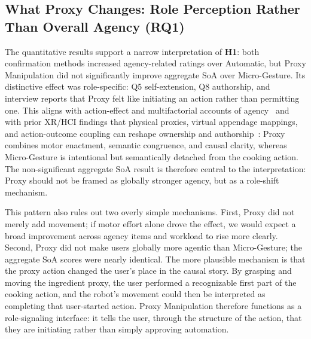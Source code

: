 \documentclass[sigconf,review,anonymous]{acmart}
\begin{document}
\subsection{What Proxy Changes: Role Perception Rather Than Overall Agency (RQ1)}
The quantitative results support a narrow interpretation of \textbf{H1}: both confirmation methods increased agency-related ratings over Automatic, but Proxy Manipulation did not significantly improve aggregate SoA over Micro-Gesture. Its distinctive effect was role-specific: Q5 self-extension, Q8 authorship, and interview reports that Proxy felt like initiating an action rather than permitting one. This aligns with action-effect and multifactorial accounts of agency~\cite{haggard2017sense, moore2016agency, chambon2014intentions, synofzik2008beyond} and with prior XR/HCI findings that physical proxies, virtual appendage mappings, and action-outcome coupling can reshape ownership and authorship~\cite{synofzik2008imove, 10.1145/3290605.3300673, 10.1145/3139131.3139149, 10.1145/3613904.3642340}: Proxy combines motor enactment, semantic congruence, and causal clarity, whereas Micro-Gesture is intentional but semantically detached from the cooking action. The non-significant aggregate SoA result is therefore central to the interpretation: Proxy should not be framed as globally stronger agency, but as a role-shift mechanism.

This pattern also rules out two overly simple mechanisms. First, Proxy did not merely add movement; if motor effort alone drove the effect, we would expect a broad improvement across agency items and workload to rise more clearly. Second, Proxy did not make users globally more agentic than Micro-Gesture; the aggregate SoA scores were nearly identical. The more plausible mechanism is that the proxy action changed the user's place in the causal story. By grasping and moving the ingredient proxy, the user performed a recognizable first part of the cooking action, and the robot's movement could then be interpreted as completing that user-started action. Proxy Manipulation therefore functions as a role-signaling interface: it tells the user, through the structure of the action, that they are initiating rather than simply approving automation.
\end{document}
